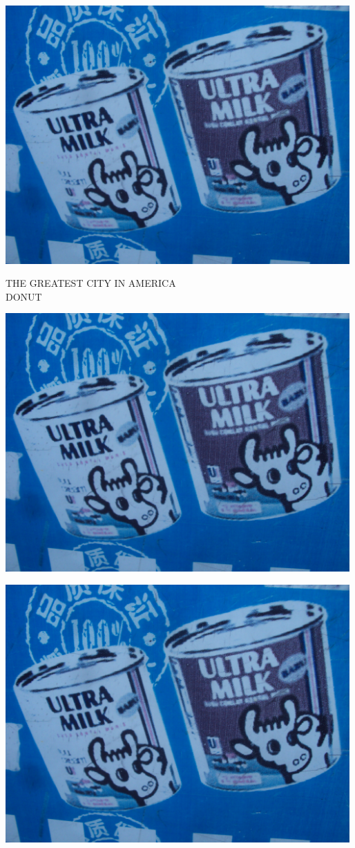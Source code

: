 \documentclass[10pt,letterpaper]{article}
\begin{document}
\vspace{0.25in}
\includegraphics[width=5.19in]{landscape.jpg}

THE GREATEST CITY IN AMERICA\\
DONUT\\
\pagebreak

\includegraphics[width=5.19in]{landscape.jpg}

\vspace{0.25in}
\includegraphics[width=5.19in]{landscape.jpg}
\end{document}
